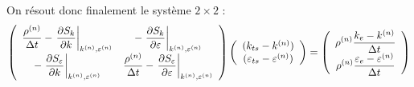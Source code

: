 On r\'esout donc finalement le syst\`eme $2\times 2$ :
\begin{equation}
\left(\begin{array}{cc}
\displaystyle \frac{\rho^{(n)}}{\Delta t}
-\left.\frac{\partial S_k}{\partial k}\right|_{k^{(n)},\varepsilon^{(n)}}
&\displaystyle
-\left.\frac{\partial S_k}{\partial \varepsilon}\right|_{k^{(n)},\varepsilon^{(n)}}\\
\displaystyle
-\left.\frac{\partial S_\varepsilon}{\partial k}\right|_{k^{(n)},\varepsilon^{(n)}}
&\displaystyle
\displaystyle \frac{\rho^{(n)}}{\Delta t}
-\left.\frac{\partial S_\varepsilon}{\partial \varepsilon}\right|_{k^{(n)},\varepsilon^{(n)}}
\end{array}\right)
\left(\begin{array}{c}
(k_{ts}-k^{(n)})\\(\varepsilon_{ts}-\varepsilon^{(n)})
\end{array}\right)
=\left(\begin{array}{c}
\displaystyle\rho^{(n)}\frac{k_e-k^{(n)}}{\Delta t}\\
\displaystyle\rho^{(n)}\frac{\varepsilon_e-\varepsilon^{(n)}}{\Delta t}
\end{array}\right)
\end{equation}

\vspace*{0.2cm}


